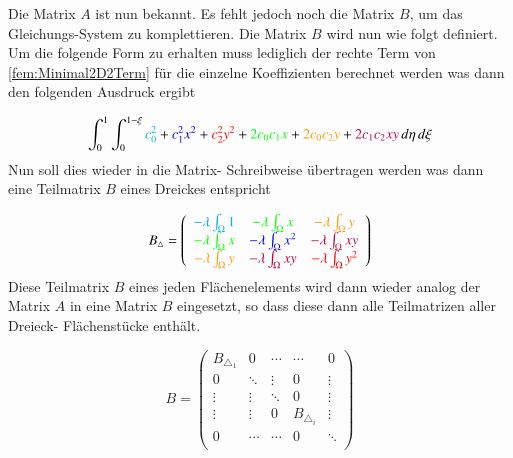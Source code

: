 Die Matrix $A$ ist nun bekannt. Es fehlt jedoch noch die Matrix $B$, um das Gleichungs-System zu komplettieren. Die Matrix $B$ wird nun wie folgt definiert. Um die folgende Form zu erhalten muss lediglich der rechte Term von \ref{fem:Minimal2D2Term} für die einzelne Koeffizienten berechnet werden was dann den folgenden Ausdruck ergibt

\begin{equation}
			\int_0^1 \int_0^{1 - \xi}  \textcolor{cyan}{c_0^2} + \textcolor{blue}{c_1^2 x^2} + \textcolor{red}{c_2^2 y^2} + \textcolor{green}{2 c_0 c_1 x} + \textcolor{orange}{2 c_0 c_2 y} +\textcolor{purple}{ 2 c_1 c_2 xy} \,  d\eta \, d \xi
			\label{fem:Minimal2LinAlgB}
\end{equation}
Nun soll dies wieder in die Matrix- Schreibweise übertragen werden was dann eine Teilmatrix $B$ eines Dreickes entspricht

\begin{equation}
 B_{\triangle} = \left( \begin{array}{ccc}
	\textcolor{cyan}{- \lambda \int_{\Omega} 1} &  \textcolor{green}{- \lambda \int_{\Omega} x} & \textcolor{orange}{- \lambda \int_{\Omega} y}  \\
	\textcolor{green}{- \lambda \int_{\Omega}x} & \textcolor{blue}{- \lambda \int_{\Omega} x^2} &  \textcolor{purple}{- \lambda \int_{\Omega} xy} \\
	\textcolor{orange}{- \lambda \int_{\Omega} y} & \textcolor{purple}{- \lambda \int_{\Omega} xy} & \textcolor{red}{ - \lambda \int_{\Omega} y^2} \\
	\end{array}\right)
	\label{fem:MatrixB}
\end{equation}
Diese Teilmatrix $B$ eines jeden Flächenelements wird dann wieder analog der Matrix $A$ in eine Matrix $B$ eingesetzt, so dass diese dann alle Teilmatrizen aller Dreieck-  Flächenstücke enthält.

\begin{equation}
B =	\begin{pmatrix}
	B_{\triangle_1} & 0 & \cdots & \cdots & 0 \\
	0 & \ddots & \vdots & 0 & \vdots \\
	\vdots & \vdots & \ddots & 0 & \vdots \\
	\vdots & \vdots & 0 & B_{\triangle_i} & \vdots \\
	0 & \cdots & \cdots & 0 &  \ddots \\
	\end{pmatrix}
\end{equation}



